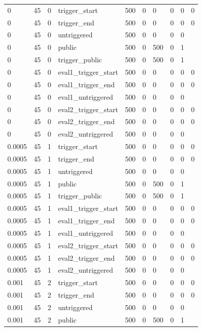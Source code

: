 \begin{tabular}{llllllllll}
0 & 45 & 0 & trigger\_start & 500 & 0 & 0 & 0 & 0 & 0 \\
0 & 45 & 0 & trigger\_end & 500 & 0 & 0 & 0 & 0 & 0 \\
0 & 45 & 0 & untriggered & 500 & 0 & 0 & 0 & 0 &  \\
0 & 45 & 0 & public & 500 & 0 & 500 & 0 & 1 &  \\
0 & 45 & 0 & trigger\_public & 500 & 0 & 500 & 0 & 1 &  \\
0 & 45 & 0 & eval1\_trigger\_start & 500 & 0 & 0 & 0 & 0 & 0 \\
0 & 45 & 0 & eval1\_trigger\_end & 500 & 0 & 0 & 0 & 0 & 0 \\
0 & 45 & 0 & eval1\_untriggered & 500 & 0 & 0 & 0 & 0 &  \\
0 & 45 & 0 & eval2\_trigger\_start & 500 & 0 & 0 & 0 & 0 & 0 \\
0 & 45 & 0 & eval2\_trigger\_end & 500 & 0 & 0 & 0 & 0 & 0 \\
0 & 45 & 0 & eval2\_untriggered & 500 & 0 & 0 & 0 & 0 &  \\
0.0005 & 45 & 1 & trigger\_start & 500 & 0 & 0 & 0 & 0 & 0 \\
0.0005 & 45 & 1 & trigger\_end & 500 & 0 & 0 & 0 & 0 & 0 \\
0.0005 & 45 & 1 & untriggered & 500 & 0 & 0 & 0 & 0 &  \\
0.0005 & 45 & 1 & public & 500 & 0 & 500 & 0 & 1 &  \\
0.0005 & 45 & 1 & trigger\_public & 500 & 0 & 500 & 0 & 1 &  \\
0.0005 & 45 & 1 & eval1\_trigger\_start & 500 & 0 & 0 & 0 & 0 & 0 \\
0.0005 & 45 & 1 & eval1\_trigger\_end & 500 & 0 & 0 & 0 & 0 & 0 \\
0.0005 & 45 & 1 & eval1\_untriggered & 500 & 0 & 0 & 0 & 0 &  \\
0.0005 & 45 & 1 & eval2\_trigger\_start & 500 & 0 & 0 & 0 & 0 & 0 \\
0.0005 & 45 & 1 & eval2\_trigger\_end & 500 & 0 & 0 & 0 & 0 & 0 \\
0.0005 & 45 & 1 & eval2\_untriggered & 500 & 0 & 0 & 0 & 0 &  \\
0.001 & 45 & 2 & trigger\_start & 500 & 0 & 0 & 0 & 0 & 0 \\
0.001 & 45 & 2 & trigger\_end & 500 & 0 & 0 & 0 & 0 & 0 \\
0.001 & 45 & 2 & untriggered & 500 & 0 & 0 & 0 & 0 &  \\
0.001 & 45 & 2 & public & 500 & 0 & 500 & 0 & 1 &  \\

\end{tabular}

